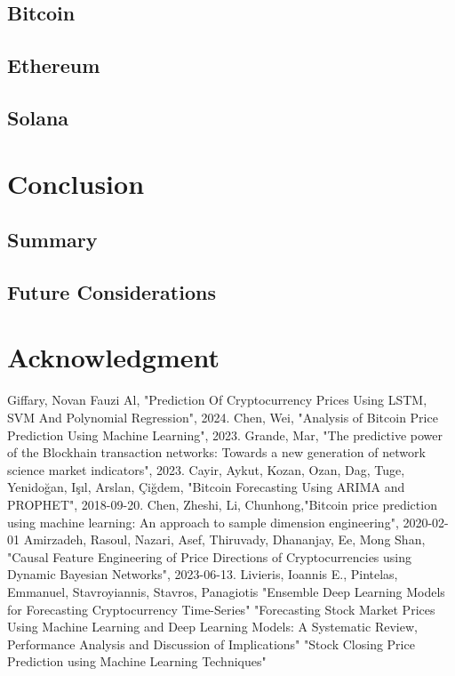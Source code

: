 \documentclass{ieeeojies}
\begin{document}
 \subsection{Bitcoin}
\subsection{Ethereum}
\subsection{Solana}
\section{Conclusion}
\subsection{Summary}

\subsection{Future Considerations}

\section*{Acknowledgment}

\begin{thebibliography}{00}
 Giffary, Novan Fauzi Al,  "Prediction Of Cryptocurrency Prices Using LSTM, SVM And Polynomial Regression", 2024.
 Chen, Wei, "Analysis of Bitcoin Price Prediction Using Machine Learning", 2023.
 Grande, Mar, "The predictive power of the Blockhain transaction networks: Towards a new generation of network science market indicators", 2023.
 Cayir, Aykut, Kozan, Ozan, Dag, Tuge, Yenidoğan, Işıl, Arslan, Çiğdem, "Bitcoin Forecasting Using ARIMA and PROPHET", 2018-09-20.
 Chen, Zheshi, Li, Chunhong,"Bitcoin price prediction using machine learning: An approach to sample dimension engineering", 2020-02-01
Amirzadeh, Rasoul, Nazari, Asef, Thiruvady, Dhananjay, Ee, Mong Shan, "Causal Feature Engineering of Price Directions of Cryptocurrencies using Dynamic Bayesian Networks", 2023-06-13.
 Livieris, Ioannis E., Pintelas, Emmanuel, Stavroyiannis, Stavros, Panagiotis "Ensemble Deep Learning Models for Forecasting Cryptocurrency Time-Series"
 "Forecasting Stock Market Prices Using Machine Learning and Deep Learning Models: A Systematic Review, Performance Analysis and Discussion of Implications"
 "Stock Closing Price Prediction using Machine Learning Techniques"
\end{thebibliography}


\EOD
\end{document}
